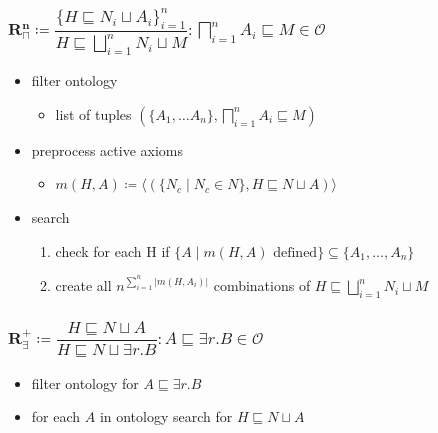 \documentclass{beamer}
\begin{document}
\begin{frame}
    \frametitle{$\mathbf{R^{n}_{\sqcap}} \coloneq \dfrac{\{H \sqsubseteq N_i \sqcup A_i \}^{n}_{i=1}}{H \sqsubseteq \bigsqcup^{n}_{i=1} N_i \sqcup M} : \bigsqcap^{n}_{i=1} A_i \sqsubseteq M \in \mathcal{O}$}
    \begin{itemize}
        \item filter ontology
        \begin{itemize}
            \item list of tuples $(\{A_1,\ldots A_n\}, \bigsqcap^{n}_{i=1} A_i \sqsubseteq M)$
        \end{itemize}
        \item preprocess active axioms
        \begin{itemize}
            \item $m(H,A) \coloneqq \langle (\{N_c \mid N_c \in N\}, H \sqsubseteq N \sqcup A)\rangle$
        \end{itemize} 
        \item search
        \begin{enumerate}
            \item check for each H if $\{A \mid m(H,A) \text{ defined} \} \subseteq \{A_1, \ldots, A_n\}$
            \item create all $n^{\sum_{i=1}^{n}|m(H,A_i)|}$ combinations of $H \sqsubseteq \bigsqcup^{n}_{i=1} N_i \sqcup M$
            
        \end{enumerate}
    \end{itemize}

\end{frame}

\begin{frame}
    \frametitle{$\mathbf{R^+_{\exists}} \coloneq \dfrac{H \sqsubseteq N \sqcup A }{ H \sqsubseteq N \sqcup \exists r.B} : A \sqsubseteq \exists r.B \in \mathcal{O}$}
    \begin{itemize}
        \item filter ontology for $A \sqsubseteq \exists r.B$
        \item for each $A$ in ontology search for $H \sqsubseteq N \sqcup A$
    \end{itemize}
\end{frame}
\end{document}
